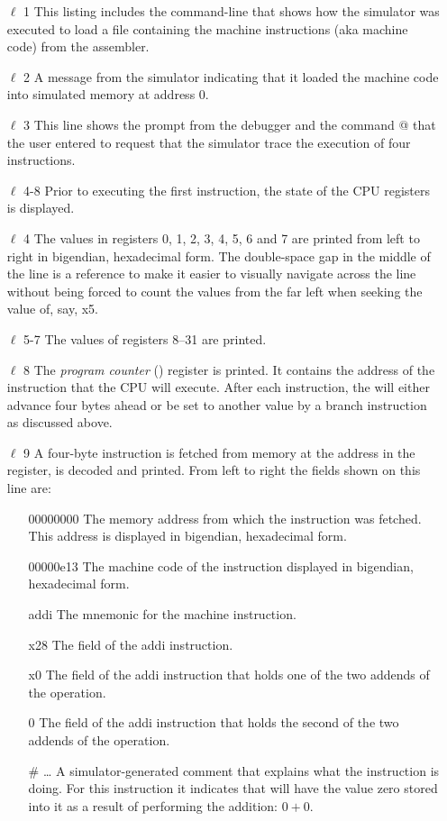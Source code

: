 \begin{itemize}
\item [$\ell$ 1] This listing includes the command-line that shows how the simulator
	was executed to load a file containing the machine instructions (aka
	machine code) from the assembler.
\item [$\ell$ 2] A message from the simulator indicating that it loaded the machine
	code into simulated memory at address 0.
\item [$\ell$ 3] This line shows the prompt from the debugger and the command
	@ that the user entered to request that the simulator trace
	the execution of four instructions.
\item [$\ell$ 4-8] Prior to executing the first instruction, the state of the
	CPU registers is displayed.
\item [$\ell$ 4] The values in registers 0, 1, 2, 3, 4, 5, 6 and 7 are printed
	from left to right in \gls{bigendian}, \gls{hexadecimal} form.
	The double-space gap in the middle of the line is a reference
	to make it easier to visually navigate across the line without being
	forced to count the values from the far left when seeking the value
	of, say, x5.
\item [$\ell$ 5-7] The values of registers 8--31 are printed.
\item [$\ell$ 8] The {\em program counter} () register is printed.
	It contains the address of the instruction that the CPU will execute.
	After each instruction, the  will either advance four bytes
	ahead or be set to another value by a branch instruction as discussed above.
\item [$\ell$ 9] A four-byte instruction is fetched from memory at the address
	in the  register, is decoded and printed.  From left to right
	the fields shown on this line are:

	\begin{itemize}

	\item [00000000] The memory address from which the instruction was
		fetched.  This address is displayed in \gls{bigendian},
		\gls{hexadecimal} form.
	\item [00000e13] The machine code of the instruction displayed in
		\gls{bigendian}, \gls{hexadecimal} form.
	\item [addi] The mnemonic for the machine instruction.
	\item [x28] The  field of the addi instruction.
	\item [x0] The  field of the addi instruction that
		holds one of the two addends of the operation.
	\item [0] The  field of the addi instruction that
		holds the second of the two addends of the operation.
	\item [\# \ldots] A simulator-generated comment that explains
		what the instruction is doing.  For this instruction it indicates
		that  will have the value zero stored into it as a result
		of performing the addition: $0+0$.
	\end{itemize}


\end{itemize}
